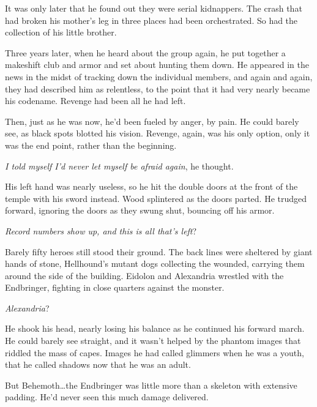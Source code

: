 It was only later that he found out they were serial kidnappers.  The crash that had broken his mother's leg in three places had been orchestrated.  So had the collection of his little brother.



Three years later, when he heard about the group again, he put together a makeshift club and armor and set about hunting them down.  He appeared in the news in the midst of tracking down the individual members, and again and again, they had described him as relentless, to the point that it had very nearly became his codename.  Revenge had been all he had left.



Then, just as he was now, he'd been fueled by anger, by pain.  He could barely see, as black spots blotted his vision.  Revenge, again, was his only option, only it was the end point, rather than the beginning.



\emph{I told myself I'd never let myself be afraid again}, he thought.



His left hand was nearly useless, so he hit the double doors at the front of the temple with his sword instead.  Wood splintered as the doors parted.  He trudged forward, ignoring the doors as they swung shut, bouncing off his armor.



\emph{Record numbers show up, and this is all that's left}?



Barely fifty heroes still stood their ground.  The back lines were sheltered by giant hands of stone, Hellhound's mutant dogs collecting the wounded, carrying them around the side of the building.  Eidolon and Alexandria wrestled with the Endbringer, fighting in close quarters against the monster.



\emph{Alexandria}?



He shook his head, nearly losing his balance as he continued his forward march.  He could barely see straight, and it wasn't helped by the phantom images that riddled the mass of capes.  Images he had called glimmers when he was a youth, that he called shadows now that he was an adult.



But Behemoth\ldots the Endbringer was little more than a skeleton with extensive padding.  He'd never seen this much damage delivered.



